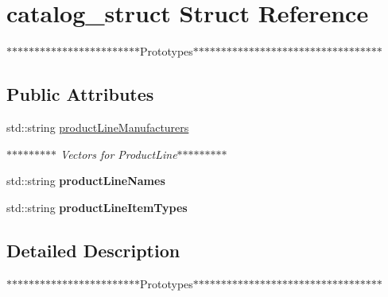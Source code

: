 \hypertarget{structcatalog__struct}{}\section{catalog\+\_\+struct Struct Reference}
\label{structcatalog__struct}


$\ast$$\ast$$\ast$$\ast$$\ast$$\ast$$\ast$$\ast$$\ast$$\ast$$\ast$$\ast$$\ast$$\ast$$\ast$$\ast$$\ast$$\ast$$\ast$$\ast$$\ast$$\ast$$\ast$$\ast$\+Prototypes$\ast$$\ast$$\ast$$\ast$$\ast$$\ast$$\ast$$\ast$$\ast$$\ast$$\ast$$\ast$$\ast$$\ast$$\ast$$\ast$$\ast$$\ast$$\ast$$\ast$$\ast$$\ast$$\ast$$\ast$$\ast$$\ast$$\ast$$\ast$$\ast$$\ast$$\ast$$\ast$$\ast$$\ast$  


\subsection*{Public Attributes}
\begin{DoxyCompactItemize}
\item 
\mbox{\label{structcatalog__struct_a534ad0c3cbbbdc66db68c862807c8db4}} 
std\+::string \mbox{\hyperlink{structcatalog__struct_a534ad0c3cbbbdc66db68c862807c8db4}{product\+Line\+Manufacturers}}
\begin{DoxyCompactList}\small\item\em $\ast$$\ast$$\ast$$\ast$$\ast$$\ast$$\ast$$\ast$$\ast$ Vectors for Product\+Line$\ast$$\ast$$\ast$$\ast$$\ast$$\ast$$\ast$$\ast$$\ast$ \end{DoxyCompactList}\item 
\mbox{\label{structcatalog__struct_a156e9b4507fb1cbf91149f0ad7515efb}} 
std\+::string {\bfseries product\+Line\+Names}
\item 
\mbox{\label{structcatalog__struct_a8fced9231ac8d409a8fc59ed2909c436}} 
std\+::string {\bfseries product\+Line\+Item\+Types}
\end{DoxyCompactItemize}


\subsection{Detailed Description}
$\ast$$\ast$$\ast$$\ast$$\ast$$\ast$$\ast$$\ast$$\ast$$\ast$$\ast$$\ast$$\ast$$\ast$$\ast$$\ast$$\ast$$\ast$$\ast$$\ast$$\ast$$\ast$$\ast$$\ast$\+Prototypes$\ast$$\ast$$\ast$$\ast$$\ast$$\ast$$\ast$$\ast$$\ast$$\ast$$\ast$$\ast$$\ast$$\ast$$\ast$$\ast$$\ast$$\ast$$\ast$$\ast$$\ast$$\ast$$\ast$$\ast$$\ast$$\ast$$\ast$$\ast$$\ast$$\ast$$\ast$$\ast$$\ast$$\ast$ 

